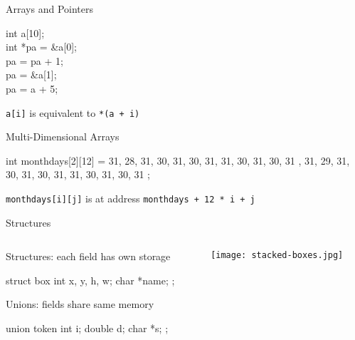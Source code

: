\documentclass{plt}
\begin{document}
\begin{frame}{Arrays and Pointers}


\vskip 1pc

{\ttfamily
int a[10];\\
\pause
int *pa = \&a[0]; \\
\pause
pa = pa + 1; \\
\pause
pa = \&a[1]; \\
\pause
pa = a + 5;
}

\texttt{a[i]} is equivalent to \texttt{*(a + i)}


\end{frame}

\begin{frame}[fragile]{Multi-Dimensional Arrays}

\begin{C}
int monthdays[2][12] = {
  { 31, 28, 31, 30, 31, 30, 31, 31, 30, 31, 30, 31 },
  { 31, 29, 31, 30, 31, 30, 31, 31, 30, 31, 30, 31 } };
\end{C}

\texttt{monthdays[i][j]} is at address \texttt{monthdays + 12 * i + j}

\end{frame}

\begin{frame}[fragile]{Structures}

\begin{columns}
  \begin{column}{0.7\textwidth}
Structures: each field has own storage

\begin{C}
struct box {
  int x, y, h, w;
  char *name;
};
\end{C}

Unions: fields share same memory

\begin{C}
union token {
  int i;
  double d;
  char *s;
};
\end{C}
  \end{column}
  \begin{column}{0.3\textwidth}
    \texttt{[image: stacked-boxes.jpg]}
  \end{column}
\end{columns}

\end{frame}
\end{document}

